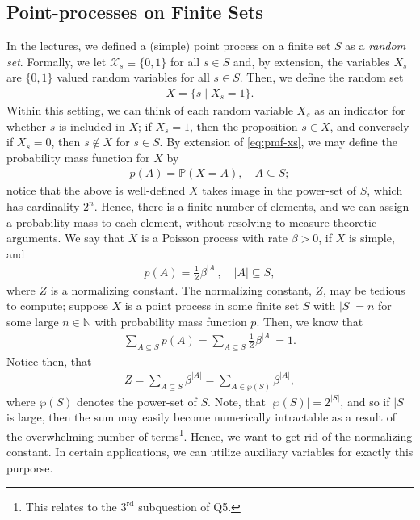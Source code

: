 \documentclass{article}
\begin{document}
\subsection*{Point-processes on Finite Sets}
In the lectures, we defined a (simple) point process on a finite set $S$ as a \textit{random set}. Formally, we let $\mathcal{X}_s \equiv \{0,1\}$ for all $s \in S$ and, by extension, the variables $X_s$ are $\{0,1\}$ valued random variables for all $s \in S$. Then, we define the random set 
\begin{align}\label{eq:random-set-X}
    X = \{s \mid X_s = 1\}. 
\end{align}
Within this setting, we can think of each random variable $X_s$ as an indicator for whether $s$ is included in $X$; if $X_s = 1$, then the proposition $s \in X$, and conversely if $X_s = 0$, then $s \notin X$ for $s \in S$. By extension of \eqref{eq:pmf-xs}, we may define the probability mass function for $X$ by 
\begin{align*}
    p(A) = \mathbb{P}(X = A),\quad A \subseteq S; 
\end{align*}
notice that the above is well-defined $X$ takes image in the power-set of $S$, which has cardinality $2^n$. Hence, there is a finite number of elements, and we can assign a probability mass to each element, without resolving to measure theoretic arguments. We say that $X$ is a Poisson process with rate $\beta > 0$, if $X$ is simple, and 
\begin{align*}
    p(A) = \frac{1}{Z}\beta^{|A|},\quad |A| \subseteq S, 
\end{align*}
where $Z$ is a normalizing constant. The normalizing constant, $Z$, may be tedious to compute; suppose $X$ is a point process in some finite set $S$ with $|S| = n$ for some large $n\in \mathbb{N}$ with probability mass function $p$. Then, we know that 
\begin{align*}
    \sum_{A \subseteq S} p(A) = \sum_{A \subseteq S} \frac{1}{Z} \beta^{|A|} = 1. 
\end{align*} 
Notice then, that 
\begin{align*}
    Z = \sum_{A \subseteq S} \beta^{|A|} = \sum_{A \in \wp(S)} \beta^{|A|},
\end{align*}
where $\wp(S)$ denotes the power-set of $S$. Note, that $|\wp(S)| = 2^{|S|}$, and so if $|S|$ is large, then the sum may easily become numerically intractable as a result of the overwhelming number of terms\footnote{This relates to the $3^{\mathrm{rd}}$ subquestion of Q5.}. Hence, we want to get rid of the normalizing constant. In certain applications, we can utilize auxiliary variables for exactly this purporse. 
\end{document}
